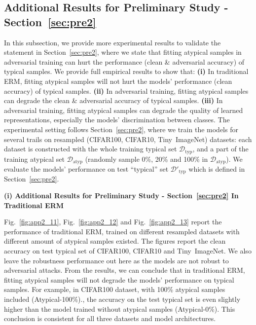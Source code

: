 

\subsection{Additional Results for Preliminary Study - Section~\ref{sec:pre2}}\label{app:pre2}

In this subsection, we provide more experimental results to validate the statement 
in Section~\ref{sec:pre2}, where we state that fitting atypical samples in adversarial training can hurt the performance (clean \& adversarial accuracy) of typical samples.
We provide full empirical results to show that: \textbf{(i)} In traditional ERM, fitting atypical samples will not hurt the models' performance (clean accuracy) of typical samples. \textbf{(ii)} In adversarial training, fitting atypical samples can degrade the clean \& adversarial accuracy of typical samples. \textbf{(iii)} In adversarial training, fitting atypical samples can degrade the quality of learned representations, especially the models' discrimination between classes.
The experimental setting follows Section~\ref{sec:pre2}, where we train the models for several trails on resampled (CIFAR100, CIFAR10, Tiny~ImageNet) datasets: each dataset is constructed with the whole training typical set $\mathcal{D}_\text{typ}$, and a part of the training atypical set $\mathcal{D}_\text{atyp}$ (randomly sample 0\%, 20\% and 100\% in $\mathcal{D}_\text{atyp}$). We evaluate the models' performance on test ``typical'' set $\mathcal{D}'_\text{typ}$ which is defined in Section~\ref{sec:pre2}.

\newpage
\textbf{(i) Additional Results for Preliminary Study - Section~\ref{sec:pre2} In Traditional ERM}

Fig.~\ref{fig:app2_11}, Fig.~\ref{fig:app2_12} and Fig.~\ref{fig:app2_13} report the performance of traditional ERM, trained on different resampled datasets with different amount of atypical samples existed. The figures report the clean accuracy on test typical set of CIFAR100, CIFAR10 and Tiny~ImageNet. We also leave the robustness performance out here as the models are not robust to adversarial attacks. From the results, we can conclude that in traditional ERM, fitting atypical samples will not degrade the models' performance on typical samples. For example, in CIFAR100 dataset, with 100\% atypical samples included (Atypical-100\%)., the accuracy on the test typical set is even slightly higher than the model trained without atypical samples (Atypical-0\%). This conclusion is consistent for all three datasets and model architectures.


